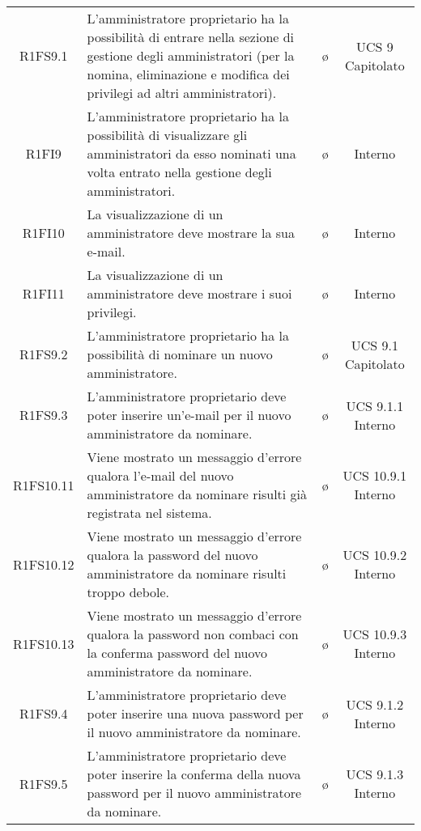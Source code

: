 {\begin{longtable}{ c C{6.5cm} c c}

R1FS9.1 & L'amministratore proprietario ha la possibilità di entrare nella sezione di gestione degli amministratori (per la nomina, eliminazione e modifica dei privilegi ad altri amministratori). & \o & UCS 9 Capitolato \\

R1FI9 & L'amministratore proprietario ha la possibilità di visualizzare gli amministratori da esso nominati una volta entrato nella gestione degli amministratori. & \o & Interno \\

R1FI10 & La visualizzazione di un amministratore deve mostrare la sua e-mail. & \o & Interno \\

R1FI11 & La visualizzazione di un amministratore deve mostrare i suoi privilegi. & \o & Interno \\

R1FS9.2 & L'amministratore proprietario ha la possibilità di nominare un nuovo amministratore. & \o & UCS 9.1 Capitolato\\

R1FS9.3 & L'amministratore proprietario deve poter inserire un'e-mail per il nuovo amministratore da nominare. & \o & UCS 9.1.1 Interno\\

R1FS10.11 & Viene mostrato un messaggio d'errore qualora l'e-mail del nuovo amministratore da nominare risulti già registrata nel sistema. & \o & UCS 10.9.1 Interno\\

R1FS10.12 & Viene mostrato un messaggio d'errore qualora la password del nuovo amministratore da nominare risulti troppo debole. & \o & UCS 10.9.2 Interno\\

R1FS10.13 & Viene mostrato un messaggio d'errore qualora la password non combaci con la conferma password del nuovo amministratore da nominare. & \o & UCS 10.9.3 Interno\\

R1FS9.4 & L'amministratore proprietario deve poter inserire una nuova password per il nuovo amministratore da nominare. & \o & UCS 9.1.2 Interno\\

R1FS9.5 & L'amministratore proprietario deve poter inserire la conferma della nuova password per il nuovo amministratore da nominare. & \o & UCS 9.1.3 Interno\\


\end{longtable}}
